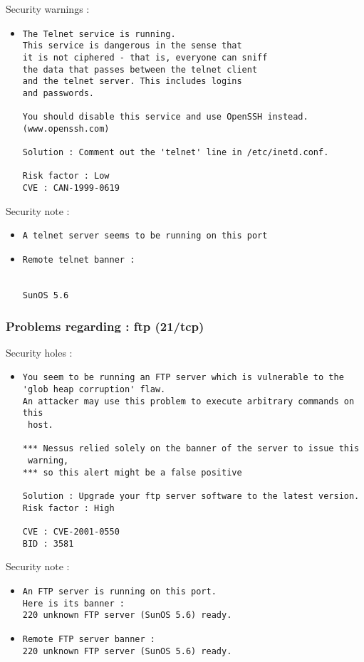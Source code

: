 \documentclass{article}
\begin{document}
Security warnings :\\
\begin{itemize}
\item \begin{verbatim}
The Telnet service is running.
This service is dangerous in the sense that
it is not ciphered - that is, everyone can sniff
the data that passes between the telnet client
and the telnet server. This includes logins
and passwords.

You should disable this service and use OpenSSH instead.
(www.openssh.com)

Solution : Comment out the 'telnet' line in /etc/inetd.conf.

Risk factor : Low
CVE : CAN-1999-0619
\end{verbatim}\end{itemize}
Security note :\\
\begin{itemize}
\item \begin{verbatim}
A telnet server seems to be running on this port
\end{verbatim}\item \begin{verbatim}
Remote telnet banner :


SunOS 5.6

\end{verbatim}\end{itemize}
\subsubsection{Problems regarding : ftp (21/tcp)}
Security holes :\\
\begin{itemize}
\item \begin{verbatim}
You seem to be running an FTP server which is vulnerable to the
'glob heap corruption' flaw.
An attacker may use this problem to execute arbitrary commands on this
 host.

*** Nessus relied solely on the banner of the server to issue this
 warning,
*** so this alert might be a false positive

Solution : Upgrade your ftp server software to the latest version.
Risk factor : High

CVE : CVE-2001-0550
BID : 3581
\end{verbatim}\end{itemize}
Security note :\\
\begin{itemize}
\item \begin{verbatim}
An FTP server is running on this port.
Here is its banner : 
220 unknown FTP server (SunOS 5.6) ready.
\end{verbatim}\item \begin{verbatim}
Remote FTP server banner :
220 unknown FTP server (SunOS 5.6) ready.
\end{verbatim}\end{itemize}
\end{document}
